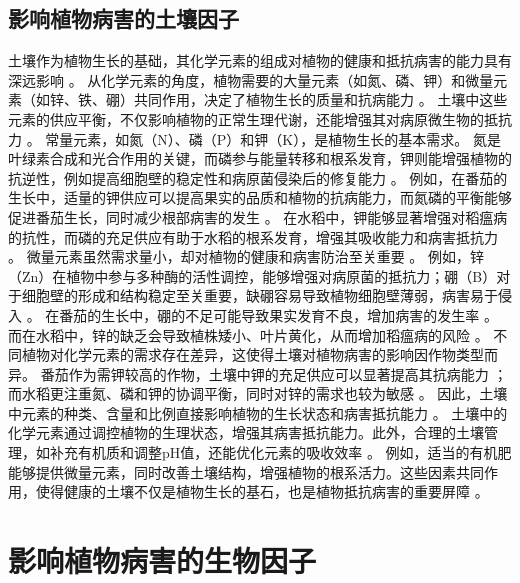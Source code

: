 \documentclass[AutoFakeBold]{LZUThesis-PgD&PhD}
\begin{document}
	\subsection{影响植物病害的土壤因子}
	
	土壤作为植物生长的基础，其化学元素的组成对植物的健康和抵抗病害的能力具有深远影响 \cite{marschner2012mineral}。  
	从化学元素的角度，植物需要的大量元素（如氮、磷、钾）和微量元素（如锌、铁、硼）共同作用，决定了植物生长的质量和抗病能力 \cite{bashir2020role}。  
	土壤中这些元素的供应平衡，不仅影响植物的正常生理代谢，还能增强其对病原微生物的抵抗力 \cite{rengel2003role}。  
	常量元素，如氮（N）、磷（P）和钾（K），是植物生长的基本需求。  
	氮是叶绿素合成和光合作用的关键，而磷参与能量转移和根系发育，钾则能增强植物的抗逆性，例如提高细胞壁的稳定性和病原菌侵染后的修复能力 \cite{liu2019effects}。  
	例如，在番茄的生长中，适量的钾供应可以提高果实的品质和植物的抗病能力，而氮磷的平衡能够促进番茄生长，同时减少根部病害的发生 \cite{zhao2014effect}。  
	在水稻中，钾能够显著增强对稻瘟病的抗性，而磷的充足供应有助于水稻的根系发育，增强其吸收能力和病害抵抗力 \cite{shahzad2020impact}。  
	微量元素虽然需求量小，却对植物的健康和病害防治至关重要 \cite{bashir2020role}。  
	例如，锌（Zn）在植物中参与多种酶的活性调控，能够增强对病原菌的抵抗力；硼（B）对于细胞壁的形成和结构稳定至关重要，缺硼容易导致植物细胞壁薄弱，病害易于侵入 \cite{rengel2003role}。  
	在番茄的生长中，硼的不足可能导致果实发育不良，增加病害的发生率 \cite{zhao2014effect}。  
	而在水稻中，锌的缺乏会导致植株矮小、叶片黄化，从而增加稻瘟病的风险 \cite{liu2019effects}。  
	不同植物对化学元素的需求存在差异，这使得土壤对植物病害的影响因作物类型而异。  
	番茄作为需钾较高的作物，土壤中钾的充足供应可以显著提高其抗病能力 \cite{zhao2014effect}；  
	而水稻更注重氮、磷和钾的协调平衡，同时对锌的需求也较为敏感 \cite{shahzad2020impact}。  
	因此，土壤中元素的种类、含量和比例直接影响植物的生长状态和病害抵抗能力 \cite{marschner2012mineral}。  
	土壤中的化学元素通过调控植物的生理状态，增强其病害抵抗能力。此外，合理的土壤管理，如补充有机质和调整pH值，还能优化元素的吸收效率 \cite{rengel2003role}。  
	例如，适当的有机肥能够提供微量元素，同时改善土壤结构，增强植物的根系活力。这些因素共同作用，使得健康的土壤不仅是植物生长的基石，也是植物抵抗病害的重要屏障 \cite{bashir2020role}。

	\section{影响植物病害的生物因子}
	
\end{document}
